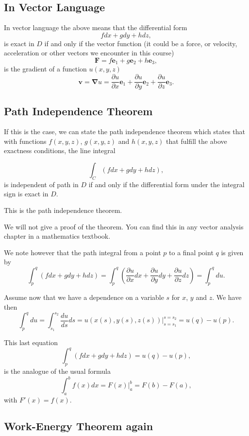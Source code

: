 \documentclass[%
oneside,                 %
final,                   %
10pt]{article}
\begin{document}
\subsection*{In Vector Language}

In vector language the above means that the differential form 
\[
fdx+gdy+hdz,
\]
is exact in $D$ if and only if the vector function (it could be a force, or velocity, acceleration or other vectors we encounter in this course)
\[
\bm{F}=f\bm{e}_1+g\bm{e}_2+h\bm{e}_3,
\]
is the gradient of a function $u(x,y,z)$
\[
\bm{v}=\bm{\nabla}u=\frac{\partial u}{\partial x}\bm{e}_1+\frac{\partial u}{\partial y}\bm{e}_2+\frac{\partial u}{\partial z}\bm{e}_3.
\]

\subsection*{Path Independence Theorem}

If this is the case, we can state the path independence theorem which
states that with functions $f(x,y,z)$, $g(x,y,z)$ and $h(x,y,z)$ that fulfill the above
exactness conditions,  the line integral

\[
\int_C\left(fdx+gdy+hdz\right),
\]
is independent of path in $D$ if and only if the differential form under the integral sign is exact in $D$.

This is the path independence theorem. 

We will not give a proof of the theorem. You can find this in any vector analysis chapter in a mathematics textbook.

We note however that the path integral from a point $p$ to a final point $q$ is given by
\[
\int_p^q\left(fdx+gdy+hdz\right)=\int_p^q\left(\frac{\partial u}{\partial x}dx+\frac{\partial u}{\partial y}dy+\frac{\partial u}{\partial z}dz\right)=\int_p^qdu.
\]

Assume now that we have a dependence on a variable $s$ for $x$, $y$ and $z$. We have then
\[
\int_p^qdu=\int_{s_1}^{s_2}\frac{du}{ds}ds = u(x(s),y(s),z(s))\vert_{s=s_1}^{s=s_2}=u(q)-u(p).
\]

This last equation
\[
\int_p^q\left(fdx+gdy+hdz\right)=u(q)-u(p),
\]
is the analogue of the usual formula
\[
\int_a^bf(x)dx=F(x)\vert_a^b=F(b)-F(a),
\]
with $F'(x)=f(x)$.

\subsection*{Work-Energy Theorem again}
\end{document}
